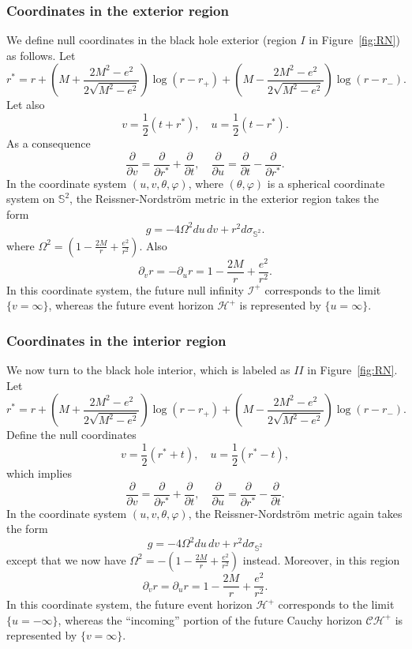 \documentclass[12 pt, reqno]{amsart}
\theoremstyle{definition}
\theoremstyle{remark}
\numberwithin{equation}{section}
\newcommand{\set}[1]{\{#1\}}
\newcommand{\rd}{\partial}
\newcommand{\0}{\emptyset}
\newcommand{\tht}{\theta}
\newcommand{\Omg}{\Omega}
\newcommand{\bbS}{\mathbb S}
\newcommand{\calC}{\mathcal C}
\newcommand{\calH}{\mathcal H}
\newcommand{\calI}{\mathcal I}
\newcommand{\f}{\frac}
\newcommand{\CH}{\calC \calH^{+}}		%
\newcommand{\EH}{\calH^{+}}
\newcommand{\red}[1]{{\color{red} #1}}
\begin{document}
\subsubsection{Coordinates in the exterior region}
We define null coordinates in the black hole exterior (region $I$ in Figure~\ref{fig:RN}) as follows.
Let
$$r^*=r+(M+\frac{2M^2-e^2}{2\sqrt{M^2-e^2}})\log (r-r_+) +(M-\frac{2M^2-e^2}{2\sqrt{M^2-e^2}})\log (r-r_-).$$
Let also 
$$v=\frac 12(t+r^*),\quad u=\frac 12(t-r^*).$$
As a consequence
$$\frac{\rd}{\rd v}= \frac{\rd}{\rd r^*}+\frac{\rd}{\rd t},\quad\frac{\rd}{\rd u}= \frac{\rd}{\rd t}-\frac{\rd}{\rd r^*}.$$
In the coordinate system $(u, v, \tht, \varphi)$, where $(\tht, \varphi)$ is a spherical coordinate system on $\bbS^{2}$, the Reissner-Nordstr\"om metric in the exterior region takes the form 
$$g=-4\Omg^2 du\,dv+ r^2 d\sigma_{\mathbb S^2}.$$
where $\Omg^2=(1-\f{2M}{r}+\f{e^2}{r^2})$. Also
\begin{equation}\label{ext.r}
\rd_v r=-\rd_u r=1-\f{2M}{r}+\f{e^2}{r^2}.
\end{equation}
In this coordinate system, the future null infinity $\calI^{+}$ corresponds to the limit $\set{v = \infty}$, whereas the future event horizon $\EH$ is represented by $\set{u = \infty}$.

\subsubsection{Coordinates in the interior region}
We now turn to the black hole interior, which is labeled as $II$ in Figure~\ref{fig:RN}. Let 
$$r^*=r+(M+\frac{2M^2-e^2}{2\sqrt{M^2-e^2}})\log (r-r_+) +(M-\frac{2M^2-e^2}{2\sqrt{M^2-e^2}})\log (r-r_-).$$
Define the null coordinates
$$v=\frac 12(r^*+t),\quad u=\frac 12(r^*-t),$$
which implies
$$\frac{\rd}{\rd v}= \frac{\rd}{\rd r^*}+\frac{\rd}{\rd t},\quad\frac{\rd}{\rd u}= \frac{\rd}{\rd r^*}-\frac{\rd}{\rd t}.$$
In the coordinate system $(u, v, \tht, \varphi)$, the Reissner-Nordstr\"{o}m metric again takes the form
$$g=-4\Omg^2 du\,dv+ r^2 d\sigma_{\mathbb S^2}$$
except that we now have $\Omg^2=-(1-\frac{2M}{r}+\frac{e^2}{r^2})$ instead. Moreover, in this region
\begin{equation}\label{int.r}
\rd_v r=\rd_u r=1-\f{2M}{r}+\f{e^2}{r^2}.
\end{equation}
In this coordinate system, the future event horizon $\EH$ corresponds to the limit $\set{u = -\infty}$, whereas the ``incoming'' portion of the future Cauchy horizon $\CH$ is represented by $\set{v = \infty}$.
\end{document}
